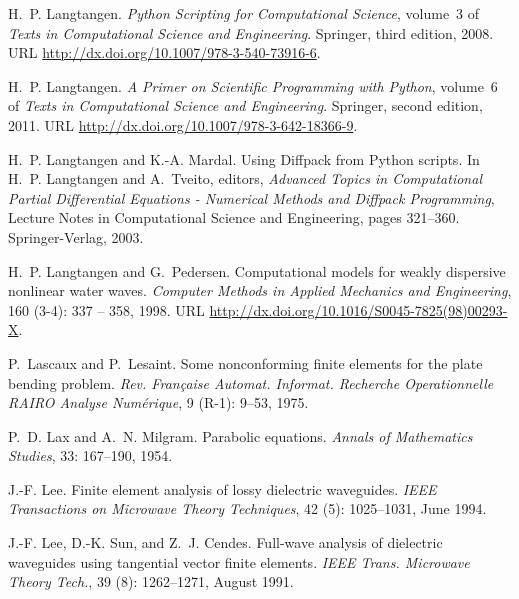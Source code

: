 \begin{thebibliography}{467}
H.~P. Langtangen.
\newblock \emph{Python Scripting for Computational Science}, volume~3 of
  \emph{Texts in Computational Science and Engineering}.
\newblock Springer, third edition, 2008.
\newblock URL \url{http://dx.doi.org/10.1007/978-3-540-73916-6}.

H.~P. Langtangen.
\newblock \emph{A Primer on Scientific Programming with Python}, volume~6 of
  \emph{Texts in Computational Science and Engineering}.
\newblock Springer, second edition, 2011.
\newblock URL \url{http://dx.doi.org/10.1007/978-3-642-18366-9}.

H.~P. Langtangen and K.-A. Mardal.
\newblock Using {D}iffpack from {P}ython scripts.
\newblock In H.~P. Langtangen and A.~Tveito, editors, \emph{Advanced Topics in
  Computational Partial Differential Equations - Numerical Methods and Diffpack
  Programming}, Lecture Notes in Computational Science and Engineering, pages
  321--360. Springer-Verlag, 2003.

H.~P. Langtangen and G.~Pedersen.
\newblock Computational models for weakly dispersive nonlinear water waves.
\newblock \emph{Computer Methods in Applied Mechanics and Engineering},
  160 (3-4): 337 -- 358, 1998.
\newblock URL \url{http://dx.doi.org/10.1016/S0045-7825(98)00293-X}.

P.~Lascaux and P.~Lesaint.
\newblock Some nonconforming finite elements for the plate bending problem.
\newblock \emph{Rev. Fran\c caise Automat. Informat. Recherche Operationnelle
  RAIRO Analyse Num\'erique}, 9 (R-1): 9--53, 1975.

P.~D. Lax and A.~N. Milgram.
\newblock Parabolic equations.
\newblock \emph{Annals of Mathematics Studies}, 33: 167--190, 1954.

J.-F. Lee.
\newblock Finite element analysis of lossy dielectric waveguides.
\newblock \emph{IEEE Transactions on Microwave Theory Techniques}, 42
  (5): 1025--1031, June 1994.

J.-F. Lee, D.-K. Sun, and Z.~J. Cendes.
\newblock Full-wave analysis of dielectric waveguides using tangential vector
  finite elements.
\newblock \emph{IEEE Trans. Microwave Theory Tech.}, 39 (8):
  1262--1271, August 1991.


\end{thebibliography}
